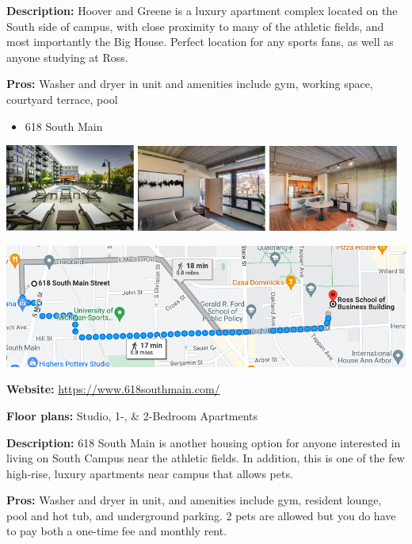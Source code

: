 \documentclass[
]{book}
\providecommand{\tightlist}{%
  \setlength{\itemsep}{0pt}\setlength{\parskip}{0pt}}
\begin{document}
\textbf{Description:} Hoover and Greene is a luxury apartment complex located on the South side of campus, with close proximity to many of the athletic fields, and most importantly the Big House. Perfect location for any sports fans, as well as anyone studying at Ross.

\textbf{Pros:} Washer and dryer in unit and amenities include gym, working space, courtyard terrace, pool

\begin{itemize}
\tightlist
\item
  618 South Main
\end{itemize}

\includegraphics[width=0.32\textwidth,height=\textheight]{SM_exterior.png}
\includegraphics[width=0.32\textwidth,height=\textheight]{SM_interior1.png}
\includegraphics[width=0.32\textwidth,height=\textheight]{SM_interior2.png}

\begin{center}\includegraphics{SM_map} \end{center}

\textbf{Website:} \url{https://www.618southmain.com/}

\textbf{Floor plans:} Studio, 1-, \& 2-Bedroom Apartments

\textbf{Description:} 618 South Main is another housing option for anyone interested in living on South Campus near the athletic fields. In addition, this is one of the few high-rise, luxury apartments near campus that allows pets.

\textbf{Pros:} Washer and dryer in unit, and amenities include gym, resident lounge, pool and hot tub, and underground parking. 2 pets are allowed but you do have to pay both a one-time fee and monthly rent.

  
\end{document}
